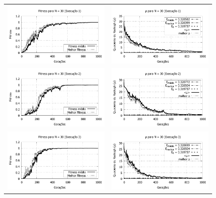 	\begin{figure}[phtb]
	\centering
  \begin{tabular}{@{}cc@{}}
		\includegraphics[width=.40\textwidth]{figs/resultados/fitnessEL/N-30_E-1_fitness-extendido.pdf} &
    \includegraphics[width=.40\textwidth]{figs/resultados/fitnessEL/N-30_E-1_rho_extendido.pdf}   \\
		\includegraphics[width=.40\textwidth]{figs/resultados/fitnessEL/N-30_E-2_fitness-extendido.pdf} &
    \includegraphics[width=.40\textwidth]{figs/resultados/fitnessEL/N-30_E-2_rho_extendido.pdf}   \\
		\includegraphics[width=.40\textwidth]{figs/resultados/fitnessEL/N-30_E-3_fitness-extendido.pdf} &
    \includegraphics[width=.40\textwidth]{figs/resultados/fitnessEL/N-30_E-3_rho_extendido.pdf}   \\

\end{tabular}
\end{figure}
